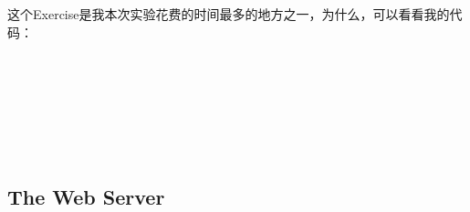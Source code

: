 \documentclass{article}
\begin{document}
\begin{CJK*}{UTF8}{gkai}
这个Exercise是我本次实验花费的时间最多的地方之一，为什么，可以看看我的代码：

\begin{lstlisting}[style=ccode, title={\scriptsize \ttfamily \bfseries kern/e100.c}]
\end{lstlisting}



\begin{lstlisting}[style=console, basicstyle=\tiny\color{green}\ttfamily\bfseries]
\end{lstlisting}

\begin{lstlisting}[style=console, basicstyle=\tiny\color{green}\ttfamily\bfseries]
\end{lstlisting}




\begin{lstlisting}[style=ccode, title={\scriptsize \ttfamily \bfseries kern/e100.c}]
\end{lstlisting}


\begin{lstlisting}[style=ccode, title={\scriptsize \ttfamily \bfseries kern/e100.c}]
\end{lstlisting}


\begin{lstlisting}[style=ccode, title={\scriptsize \ttfamily \bfseries kern/e100.c}]
\end{lstlisting}

\begin{lstlisting}[style=ccode, title={\scriptsize \ttfamily \bfseries kern/e100.c}]
\end{lstlisting}


\begin{lstlisting}[style=console]
\end{lstlisting}


\begin{lstlisting}[style=console]
\end{lstlisting}



\subsection{The Web Server}

\begin{lstlisting}[style=ccode, title={\scriptsize \ttfamily \bfseries kern/pci.c}]
\end{lstlisting}

\begin{lstlisting}[style=exercise]
\end{lstlisting}

\clearpage

\end{CJK*}
\end{document}
